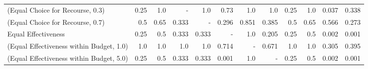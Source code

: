 \documentclass{article}
\begin{document}
\begin{table}[ht]
{\begin{tabular}{lrrrrrrrrrrr}
(Equal Choice for Recourse, 0.3)           &                                      0.25 &                                       1.0 &                                - &                              1.0 &                0.73 &                                      1.0 &                                      1.0 &                                      0.25 &                                       1.0 &                            0.037 &                                      0.338 \\
(Equal Choice for Recourse, 0.7)           &                                       0.5 &                                      0.65 &                            0.333 &                                - &               0.296 &                                    0.851 &                                    0.385 &                                       0.5 &                                      0.65 &                            0.566 &                                      0.273 \\
Equal Effectiveness                        &                                      0.25 &                                       0.5 &                            0.333 &                            0.333 &                   - &                                      1.0 &                                    0.205 &                                      0.25 &                                       0.5 &                            0.002 &                                      0.001 \\
(Equal Effectiveness within Budget, 1.0)   &                                       1.0 &                                       1.0 &                              1.0 &                              1.0 &               0.714 &                                        - &                                    0.671 &                                       1.0 &                                       1.0 &                            0.305 &                                      0.395 \\
(Equal Effectiveness within Budget, 5.0)   &                                      0.25 &                                       0.5 &                            0.333 &                            0.333 &               0.001 &                                      1.0 &                                        - &                                      0.25 &                                       0.5 &                            0.002 &                                      0.001 \\

\end{tabular}}
\end{table}
\end{document}

